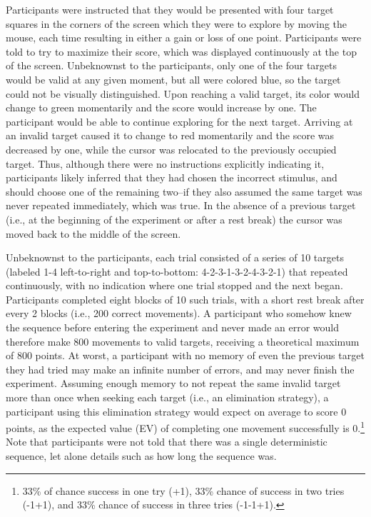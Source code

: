 \documentclass[man,floatsintext]{apa6}
\begin{document}
Participants were instructed that they would be presented with four target squares in the corners of the screen which they were to explore by moving the mouse, each time resulting in either a gain or loss of one point. Participants were told to try to maximize their score, which was displayed continuously at the top of the screen. Unbeknownst to the participants, only one of the four targets would be valid at any given moment, but all were colored blue, so the target could not be visually distinguished. Upon reaching a valid target, its color would change to green momentarily and the score would increase by one. The participant would be able to continue exploring for the next target. Arriving at an invalid target caused it to change to red momentarily and the score was decreased by one, while the cursor was relocated to the previously occupied target. Thus, although there were no instructions explicitly indicating it, participants likely inferred that they had chosen the incorrect stimulus, and should choose one of the remaining two--if they also assumed the same target was never repeated immediately, which was true. In the absence of a previous target (i.e., at the beginning of the experiment or after a rest break) the cursor was moved back to the middle of the screen.

Unbeknownst to the participants, each trial consisted of a series of 10 targets (labeled 1-4 left-to-right and top-to-bottom: 4-2-3-1-3-2-4-3-2-1) that repeated continuously, with no indication where one trial stopped and the next began. Participants completed eight blocks of 10 such trials,  with a short rest break after every 2 blocks (i.e., 200 correct movements). A participant who somehow knew the sequence before entering the experiment and never made an error would therefore make 800 movements to valid targets, receiving a theoretical maximum of 800 points. At worst, a participant with no memory of even the previous target they had tried may make an infinite number of errors, and may never finish the experiment. Assuming enough memory to not repeat the same invalid target more than once when seeking each target (i.e., an elimination strategy), a participant using this elimination strategy would expect on average to score 0 points, as the expected value (EV) of completing one movement successfully is 0.\footnote{33\% of chance success in one try (+1), 33\% chance of success in two tries (-1+1), and 33\% chance of success in three tries (-1-1+1).} Note that participants were not told that there was a single deterministic sequence, let alone details such as how long the sequence was. 
\end{document}
